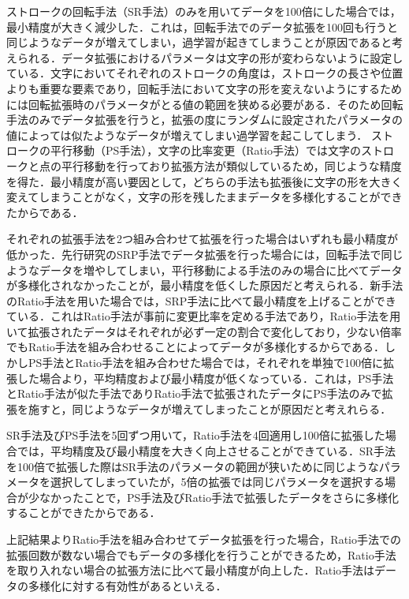 ストロークの回転手法（SR手法）のみを用いてデータを100倍にした場合では，最小精度が大きく減少した．これは，回転手法でのデータ拡張を100回も行うと同じようなデータが増えてしまい，過学習が起きてしまうことが原因であると考えられる．データ拡張におけるパラメータは文字の形が変わらないように設定している．文字においてそれぞれのストロークの角度は，ストロークの長さや位置よりも重要な要素であり，回転手法において文字の形を変えないようにするためには回転拡張時のパラメータがとる値の範囲を狭める必要がある．そのため回転手法のみでデータ拡張を行うと，拡張の度にランダムに設定されたパラメータの値によっては似たようなデータが増えてしまい過学習を起こしてしまう．
ストロークの平行移動（PS手法），文字の比率変更（Ratio手法）では文字のストロークと点の平行移動を行っており拡張方法が類似しているため，同じような精度を得た．最小精度が高い要因として，どちらの手法も拡張後に文字の形を大きく変えてしまうことがなく，文字の形を残したままデータを多様化することができたからである．

それぞれの拡張手法を2つ組み合わせて拡張を行った場合はいずれも最小精度が低かった．先行研究\cite{takahashi}のSRP手法でデータ拡張を行った場合には，回転手法で同じようなデータを増やしてしまい，平行移動による手法のみの場合に比べてデータが多様化されなかったことが，最小精度を低くした原因だと考えられる．新手法のRatio手法を用いた場合では，SRP手法に比べて最小精度を上げることができている．これはRatio手法が事前に変更比率を定める手法であり，Ratio手法を用いて拡張されたデータはそれぞれが必ず一定の割合で変化しており，少ない倍率でもRatio手法を組み合わせることによってデータが多様化するからである．しかしPS手法とRatio手法を組み合わせた場合では，それぞれを単独で100倍に拡張した場合より，平均精度および最小精度が低くなっている．これは，PS手法とRatio手法が似た手法でありRatio手法で拡張されたデータにPS手法のみで拡張を施すと，同じようなデータが増えてしまったことが原因だと考えれらる．

SR手法及びPS手法を5回ずつ用いて，Ratio手法を4回適用し100倍に拡張した場合では，平均精度及び最小精度を大きく向上させることができている．SR手法を100倍で拡張した際はSR手法のパラメータの範囲が狭いために同じようなパラメータを選択してしまっていたが，5倍の拡張では同じパラメータを選択する場合が少なかったことで，PS手法及びRatio手法で拡張したデータをさらに多様化することができたからである．

上記結果よりRatio手法を組み合わせてデータ拡張を行った場合，Ratio手法での拡張回数が数ない場合でもデータの多様化を行うことができるため，Ratio手法を取り入れない場合の拡張方法に比べて最小精度が向上した．Ratio手法はデータの多様化に対する有効性があるといえる．
 
